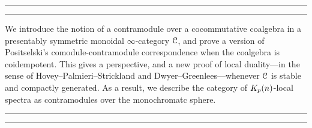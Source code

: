 

\vspace*{5cm}

{\par{}\par}
\vspace{-2em}
\rule[-11pt]{\textwidth}{1pt}
\rule{\textwidth}{0.5pt}
    
We introduce the notion of a contramodule over a cocommutative coalgebra in a presentably symmetric monoidal $\infty$-category $\EuScript{C}$, and prove a version of Positselski's comodule-contramodule correspondence when the coalgebra is coidempotent. This gives a perspective, and a new proof of local duality---in the sense of Hovey--Palmieri--Strickland and Dwyer--Greenlees---whenever $\EuScript{C}$ is stable and compactly generated. As a result, we describe the category of ${K_p(n)}$-local spectra as contramodules over the monochromatc sphere. 

\rule{\textwidth}{0.5pt}
\rule[11pt]{\textwidth}{1pt}
\vspace{\fill}

